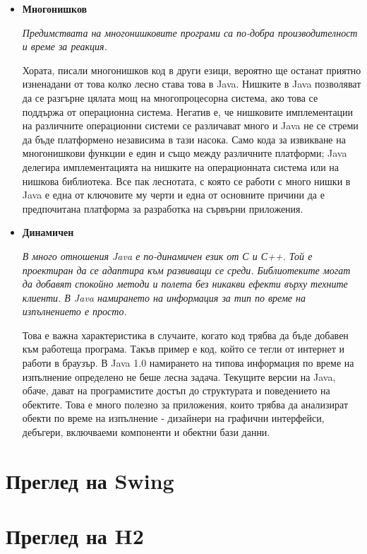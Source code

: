 \begin{itemize}
  \item \textbf{Многонишков}

       \emph{Предимствата на многонишковите програми са по-добра
       производителност и време за реакция.}

       Хората, писали многонишков код в други езици, вероятно ще
       останат приятно изненадани от това колко лесно става това в
       Java. Нишките в Java позволяват да се разгърне цялата мощ на
       многопроцесорна система, ако това се поддържа от операционна
       система. Негатив е, че нишковите имплементации на различните
       операционни системи се различават много и Java не се стреми да
       бъде платформено независима в тази насока. Само кода за
       извикване на многонишкови функции е един и също между
       различните платформи; Java делегира имплементацията на нишките
       на операционната система или на нишкова библиотека. Все пак
       леснотата, с която се работи с много нишки в Java е една от
       ключовите му черти и една от основните причини да е
       предпочитана платформа за разработка на сървърни приложения.


  \item \textbf{Динамичен}

    \emph{В много отношения Java е по-динамичен език от С и С++. Той е
    проектиран да се адаптира към развиващи се среди. Библиотеките
    могат да добавят спокойно методи и полета без никакви ефекти върху
    техните клиенти. В Java намирането на информация за тип по време
    на изпълнението е просто.}

    Това е важна характеристика в случаите, когато код трябва да бъде
    добавен към работеща програма. Такъв пример е код, който се тегли
    от интернет и работи в браузър. В Java 1.0 намирането на типова
    информация по време на изпълнение определено не беше лесна
    задача. Текущите версии на Java, обаче, дават на програмистите
    достъп до структурата и поведението на обектите. Това е много
    полезно за приложения, които трябва да анализират обекти по време
    на изпълнение - дизайнери на графични интерфейси, дебъгери,
    включваеми компоненти и обектни бази данни.

\end{itemize}
\section{Преглед на Swing}
\section{Преглед на H2}
